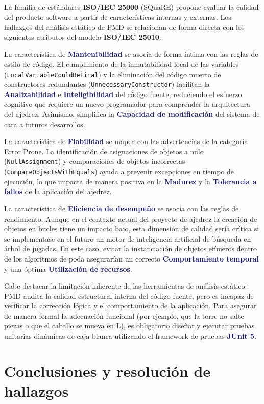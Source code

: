 \documentclass[12pt,a4paper]{article}
\newcommand{\key}[1]{\textbf{\textcolor{MidnightBlue}{#1}}}
\newcommand{\norma}[1]{\textbf{\textcolor{BrickRed}{#1}}}
\begin{document}
La familia de estándares \norma{ISO/IEC 25000} (SQuaRE) propone evaluar la calidad del producto software a partir de características internas y externas. Los hallazgos del análisis estático de PMD se relacionan de forma directa con los siguientes atributos del modelo \norma{ISO/IEC 25010}:

La característica de \key{Mantenibilidad} se asocia de forma íntima con las reglas de estilo de código. El cumplimiento de la inmutabilidad local de las variables (\texttt{LocalVariableCouldBeFinal}) y la eliminación del código muerto de constructores redundantes (\texttt{UnnecessaryConstructor}) facilitan la \key{Analizabilidad} e \key{Inteligibilidad} del código fuente, reduciendo el esfuerzo cognitivo que requiere un nuevo programador para comprender la arquitectura del ajedrez. Asimismo, simplifica la \key{Capacidad de modificación} del sistema de cara a futuros desarrollos.

La característica de \key{Fiabilidad} se mapea con las advertencias de la categoría Error Prone. La identificación de asignaciones de objetos a nulo (\texttt{NullAssignment}) y comparaciones de objetos incorrectas (\texttt{CompareObjectsWithEquals}) ayuda a prevenir excepciones en tiempo de ejecución, lo que impacta de manera positiva en la \key{Madurez} y la \key{Tolerancia a fallos} de la aplicación del ajedrez.

La característica de \key{Eficiencia de desempeño} se asocia con las reglas de rendimiento. Aunque en el contexto actual del proyecto de ajedrez la creación de objetos en bucles tiene un impacto bajo, esta dimensión de calidad sería crítica si se implementase en el futuro un motor de inteligencia artificial de búsqueda en árbol de jugadas. En este caso, evitar la instanciación de objetos efímeros dentro de los algoritmos de poda asegurarían un correcto \key{Comportamiento temporal} y una óptima \key{Utilización de recursos}.

Cabe destacar la limitación inherente de las herramientas de análisis estático: PMD audita la calidad estructural interna del código fuente, pero es incapaz de verificar la corrección lógica y el comportamiento de la aplicación. Para asegurar de manera formal la adecuación funcional (por ejemplo, que la torre no salte piezas o que el caballo se mueva en L), es obligatorio diseñar y ejecutar pruebas unitarias dinámicas de caja blanca utilizando el framework de pruebas \key{JUnit 5}.

\section{Conclusiones y resolución de hallazgos}
\end{document}
